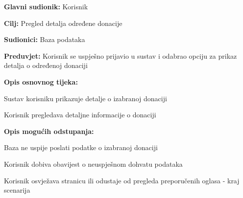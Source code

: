 					\noindent {}
					\begin{packed_item}
	
						\item \textbf{Glavni sudionik: }Korisnik
						\item  \textbf{Cilj:} Pregled detalja određene donacije
						\item  \textbf{Sudionici:} Baza podataka
						\item  \textbf{Preduvjet:} Korisnik se uspješno prijavio u sustav i odabrao opciju za prikaz detalja o određenoj donaciji
						\item  \textbf{Opis osnovnog tijeka:}
						
						\item[] \begin{packed_enum}
							\item Sustav korisniku prikazuje detalje o izabranoj donaciji
							\item Korisnik pregledava detaljne informacije o donaciji
						\end{packed_enum}

						\item  \textbf{Opis mogućih odstupanja:}

						\item[] \begin{packed_item}
							\item[1.a] Baza ne uspije poslati podatke o izabranoj donaciji
							\item[] \begin{packed_enum}
								
								\item Korisnik dobiva obavijest o neuspješnom dohvatu podataka
								\item Korisnik osvježava stranicu ili odustaje od pregleda preporučenih oglasa - kraj scenarija
							
							\end{packed_enum}	
						\end{packed_item}	
					\end{packed_item}


